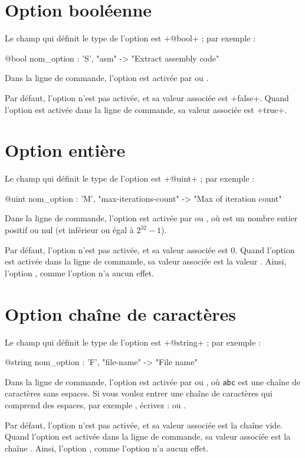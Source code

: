 \section{Option booléenne}

Le champ qui définit le type de l'option est \ggs+@bool+ ; par exemple :
\begin{galgas}
  @bool nom_option : 'S', "asm" -> "Extract assembly code"
\end{galgas}

Dans la ligne de commande, l'option est activée par  ou .

Par défaut, l'option n'est pas activée, et sa valeur associée est \ggs+false+. Quand l'option est activée dans la ligne de commande, sa valeur associée est \ggs+true+.








\section{Option entière}

Le champ qui définit le type de l'option est \ggs+@uint+ ; par exemple :
\begin{galgas}
  @uint nom_option : 'M', "max-iterations-count" -> "Max of iteration count"
\end{galgas}

Dans la ligne de commande, l'option est activée par  ou , où  est un nombre entier positif ou nul (et inférieur ou égal à $2^{32}-1$).

Par défaut, l'option n'est pas activée, et sa valeur associée est $0$. Quand l'option est activée dans la ligne de commande, sa valeur associée est la valeur . Ainsi, l'option , comme l'option  n'a aucun effet.










\section{Option chaîne de caractères}

Le champ qui définit le type de l'option est \ggs+@string+ ; par exemple :
\begin{galgas}
  @string nom_option : 'F', "file-name" -> "File name"
\end{galgas}

Dans la ligne de commande, l'option est activée par  ou , où \texttt{abc} est une chaîne de caractères sans espaces. Si vous voulez entrer une chaîne de caractères qui comprend des espaces, par exemple , écrivez :  ou .

Par défaut, l'option n'est pas activée, et sa valeur associée est la chaîne vide. Quand l'option est activée dans la ligne de commande, sa valeur associée est la chaîne . Ainsi, l'option , comme l'option  n'a aucun effet.


